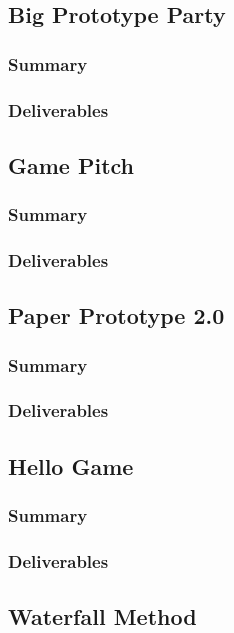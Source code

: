 \subsection{Big Prototype Party}
\subsubsection{Summary}
\subsubsection{Deliverables}

\subsection{Game Pitch}
\subsubsection{Summary}
\subsubsection{Deliverables}

\subsection{Paper Prototype 2.0}
\subsubsection{Summary}
\subsubsection{Deliverables}

\subsection{Hello Game}
\subsubsection{Summary}
\subsubsection{Deliverables}

\subsection{Waterfall Method}
